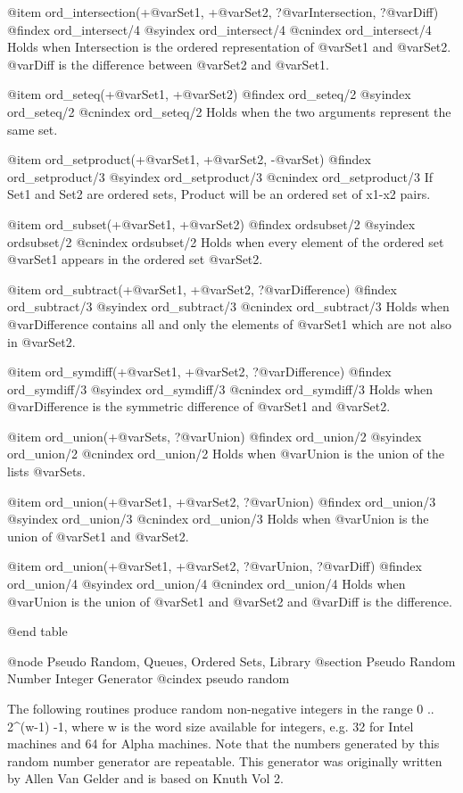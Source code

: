 @item ord_intersection(+@var{Set1}, +@var{Set2}, ?@var{Intersection}, ?@var{Diff})
@findex ord_intersect/4
@syindex ord_intersect/4
@cnindex ord_intersect/4
Holds when Intersection is the ordered representation of @var{Set1}
and @var{Set2}. @var{Diff} is the difference between @var{Set2} and @var{Set1}.

@item ord_seteq(+@var{Set1}, +@var{Set2})
@findex ord_seteq/2
@syindex ord_seteq/2
@cnindex ord_seteq/2
Holds when the two arguments represent the same set.

@item ord_setproduct(+@var{Set1}, +@var{Set2}, -@var{Set})
@findex ord_setproduct/3
@syindex ord_setproduct/3
@cnindex ord_setproduct/3
If Set1 and Set2 are ordered sets, Product will be an ordered
set of x1-x2 pairs.

@item ord_subset(+@var{Set1}, +@var{Set2})
@findex ordsubset/2
@syindex ordsubset/2
@cnindex ordsubset/2
Holds when every element of the ordered set @var{Set1} appears in the
ordered set @var{Set2}.

@item ord_subtract(+@var{Set1}, +@var{Set2}, ?@var{Difference})
@findex ord_subtract/3
@syindex ord_subtract/3
@cnindex ord_subtract/3
Holds when @var{Difference} contains all and only the elements of @var{Set1}
which are not also in @var{Set2}.

@item ord_symdiff(+@var{Set1}, +@var{Set2}, ?@var{Difference})
@findex ord_symdiff/3
@syindex ord_symdiff/3
@cnindex ord_symdiff/3
Holds when @var{Difference} is the symmetric difference of @var{Set1}
and @var{Set2}.

@item ord_union(+@var{Sets}, ?@var{Union})
@findex ord_union/2
@syindex ord_union/2
@cnindex ord_union/2
Holds when @var{Union} is the union of the lists @var{Sets}.

@item ord_union(+@var{Set1}, +@var{Set2}, ?@var{Union})
@findex ord_union/3
@syindex ord_union/3
@cnindex ord_union/3
Holds when @var{Union} is the union of @var{Set1} and @var{Set2}.

@item ord_union(+@var{Set1}, +@var{Set2}, ?@var{Union}, ?@var{Diff})
@findex ord_union/4
@syindex ord_union/4
@cnindex ord_union/4
Holds when @var{Union} is the union of @var{Set1} and @var{Set2} and
@var{Diff} is the difference.

@end table

@node Pseudo Random, Queues, Ordered Sets, Library
@section Pseudo Random Number Integer Generator
@cindex pseudo random

The following routines produce random non-negative integers in the range
0 .. 2^(w-1) -1, where w is the word size available for integers, e.g.
32 for Intel machines and 64 for Alpha machines. Note that the numbers
generated by this random number generator are repeatable. This generator
was originally written by Allen Van Gelder and is based on Knuth Vol 2.

